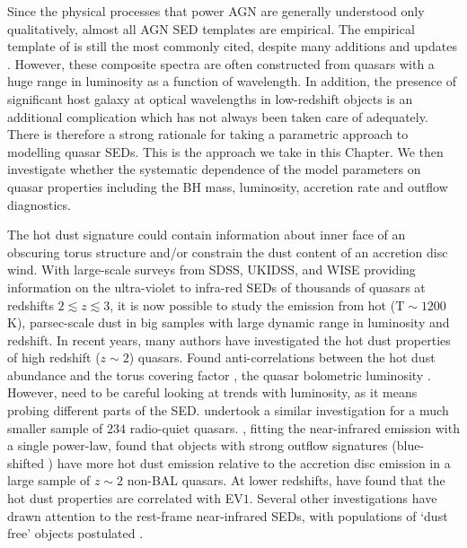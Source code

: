 Since the physical processes that power AGN are generally understood only qualitatively, almost all AGN SED templates are empirical. 
The empirical template of \citet{elvis94} is still the most commonly cited, despite many additions and updates \citep[e.g.][]{polletta00, kuraszkiewicz03, risaliti04, richards06,  polletta07, lusso10, shang11, marchese12, trichas12}. 
However, these composite spectra are often constructed from quasars with a huge range in luminosity as a function of wavelength. 
In addition, the presence of significant host galaxy at optical wavelengths in low-redshift objects is an additional complication which has not always been taken care of adequately. 
There is therefore a strong rationale for taking a parametric approach to modelling quasar SEDs. 
This is the approach we take in this Chapter. 
We then investigate whether the systematic dependence of the model parameters on quasar properties including the BH mass, luminosity, accretion rate and outflow diagnostics. 

The hot dust signature could contain information about inner face of an obscuring torus structure and/or constrain the dust content of an accretion disc wind.  
With large-scale surveys from SDSS, UKIDSS, and WISE providing information on the ultra-violet to infra-red SEDs of thousands of quasars at redshifts $2\lesssim z \lesssim3$, it is now possible to study the emission from hot (${\mathrm T}\sim1200$\,K), parsec-scale dust in big samples with large dynamic range in luminosity and redshift. 
In recent years, many authors have investigated the hot dust properties of high redshift ($z\sim2$) quasars. 
Found anti-correlations between the hot dust abundance and the torus covering factor \citep{roseboom13}, the quasar bolometric luminosity \citep{mor11}. 
However, need to be careful looking at trends with luminosity, as it means probing different parts of the SED. 
\citet{gallagher07} undertook a similar investigation for a much smaller sample of $234$ radio-quiet quasars.
\citet{wang13}, fitting the near-infrared emission with a single power-law, found that objects with strong outflow signatures (blue-shifted ) have more hot dust emission relative to the accretion disc emission in a large sample of $z\sim2$ non-BAL quasars. 
At lower redshifts, \citet{shen14} have found that the hot dust properties are correlated with EV$1$. 
Several other investigations have drawn attention to the rest-frame near-infrared SEDs, with populations of `dust free' objects postulated \citep{hao10,hao11,jiang10,mor11}.

